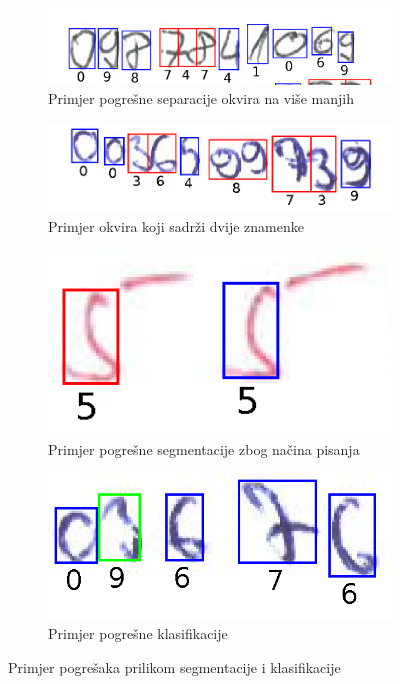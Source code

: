 \documentclass[times, utf8, diplomski]{fer}
\theoremstyle{definition}
\begin{document}
\begin{figure}
	\begin{subfigure}[t]{.5\textwidth}
		\centering
		\includegraphics[width=\linewidth]{error_2.png}
		\caption{Primjer pogrešne separacije okvira na više manjih}
		\label{error1}
	\end{subfigure}
	\hfill
	\begin{subfigure}[t]{.5\textwidth}
		\centering
		\includegraphics[width=\linewidth]{postprocesor.png}
		\caption{Primjer okvira koji sadrži dvije znamenke}
		\label{error2}
	\end{subfigure}
	
	\medskip
	
	\begin{subfigure}[t]{.5\textwidth}
		\centering
		\includegraphics[width=\linewidth]{error_3.png}
		\caption{Primjer pogrešne segmentacije zbog načina pisanja}
		\label{error3}
	\end{subfigure}
	\hfill
	\begin{subfigure}[t]{.5\textwidth}
		\centering
		\includegraphics[width=\linewidth]{error_4.png}
		\caption{Primjer pogrešne klasifikacije}
		 \label{error4}
	\end{subfigure}
\caption{Primjer pogrešaka prilikom segmentacije i klasifikacije}
\end{figure}
\end{document}
